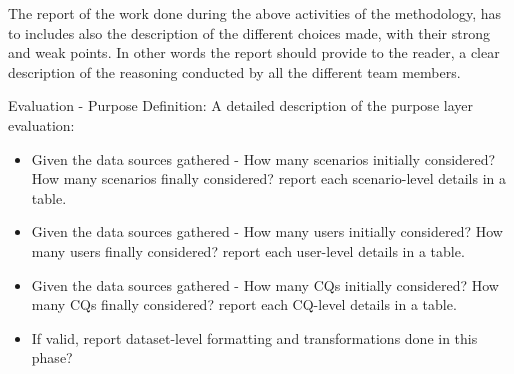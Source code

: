 \noindent The report of the work done during the above activities of the methodology, has to includes also the description of the  different choices made, with their strong and weak points. In other words the report should provide to the reader, a clear description of the reasoning conducted by all the different team members.


Evaluation - Purpose Definition: A detailed description of the purpose layer evaluation:
\begin{itemize}
    \item Given the data sources gathered - How many scenarios initially considered? How many scenarios finally considered? report each scenario-level details in a table.
    \item Given the data sources gathered - How many users initially considered? How many users finally considered? report each user-level details in a table.
    \item Given the data sources gathered - How many CQs initially considered? How many CQs finally considered? report each CQ-level details in a table.
    \item If valid, report dataset-level formatting and transformations done in this phase?
\end{itemize}